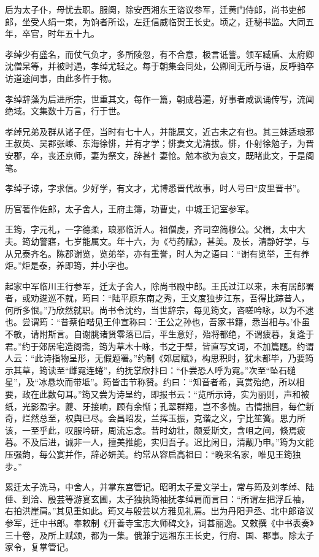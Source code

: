 \documentclass[12pt,UTF8]{ctexbook}
\begin{document}
后为太子仆，母忧去职。服阕，除安西湘东王谘议参军，迁黄门侍郎，尚书吏部郎，坐受人绢一束，为饷者所讼，左迁信威临贺王长史。顷之，迁秘书监。大同五年，卒官，时年五十九。

孝绰少有盛名，而仗气负才，多所陵忽，有不合意，极言诋訾。领军臧盾、太府卿沈僧杲等，并被时遇，孝绰尤轻之。每于朝集会同处，公卿间无所与语，反呼驺卒访道途间事，由此多忤于物。

孝绰辞藻为后进所宗，世重其文，每作一篇，朝成暮遍，好事者咸讽诵传写，流闻绝域。文集数十万言，行于世。

孝绰兄弟及群从诸子侄，当时有七十人，并能属文，近古未之有也。其三妹适琅邪王叔英、吴郡张嵊、东海徐悱，并有才学；悱妻文尤清拔。悱，仆射徐勉子，为晋安郡，卒，丧还京师，妻为祭文，辞甚忄妻怆。勉本欲为哀文，既睹此文，于是阁笔。

孝绰子谅，字求信。少好学，有文才，尤博悉晋代故事，时人号曰“皮里晋书”。

历官著作佐郎，太子舍人，王府主簿，功曹史，中城王记室参军。

王筠，字元礼，一字德柔，琅邪临沂人。祖僧虔，齐司空简穆公。父楫，太中大夫。筠幼警寤，七岁能属文。年十六，为《芍药赋》，甚美。及长，清静好学，与从兄泰齐名。陈郡谢览，览弟举，亦有重誉，时人为之语曰：“谢有览举，王有养炬。”炬是泰，养即筠，并小字也。

起家中军临川王行参军，迁太子舍人，除尚书殿中郎。王氏过江以来，未有居郎署者，或劝逡巡不就，筠曰：“陆平原东南之秀，王文度独步江东，吾得比踪昔人，何所多恨。”乃欣然就职。尚书令沈约，当世辞宗，每见筠文，咨嗟吟咏，以为不逮也。尝谓筠：“昔蔡伯喈见王仲宣称曰：‘王公之孙也，吾家书籍，悉当相与。’仆虽不敏，请附斯言。自谢朓诸贤零落已后，平生意好，殆将都绝，不谓疲暮，复逢于君。”约于郊居宅造阁斋，筠为草木十咏，书之于壁，皆直写文词，不加篇题。约谓人云：“此诗指物呈形，无假题署。”约制《郊居赋》，构思积时，犹未都毕，乃要筠示其草，筠读至“雌霓连蜷”，约抚掌欣抃曰：“仆尝恐人呼为霓。”次至“坠石磓星”，及“冰悬坎而带坻”。筠皆击节称赞。约曰：“知音者希，真赏殆绝，所以相要，政在此数句耳。”筠又尝为诗呈约，即报书云：“览所示诗，实为丽则，声和被纸，光影盈字。夔、牙接响，顾有余惭；孔翠群翔，岂不多愧。古情拙目，每伫新奇，烂然总至，权舆已尽。会昌昭发，兰挥玉振，克谐之义，宁比笙簧。思力所该，一至乎此，叹服吟研，周流忘念。昔时幼壮，颇爱斯文，含咀之间，倏焉疲暮。不及后进，诚非一人，擅美推能，实归吾子。迟比闲日，清觏乃申。”筠为文能压强韵，每公宴并作，辞必妍美。约常从容启高祖曰：“晚来名家，唯见王筠独步。”

累迁太子洗马，中舍人，并掌东宫管记。昭明太子爱文学士，常与筠及刘孝绰、陆倕、到洽、殷芸等游宴玄圃，太子独执筠袖抚孝绰肩而言曰：“所谓左把浮丘袖，右拍洪崖肩。”其见重如此。筠又与殷芸以方雅见礼焉。出为丹阳尹丞、北中郎谘议参军，迁中书郎。奉敕制《开善寺宝志大师碑文》，词甚丽逸。又敕撰《中书表奏》三十卷，及所上赋颂，都为一集。俄兼宁远湘东王长史，行府、国、郡事。除太子家令，复掌管记。
\end{document}
